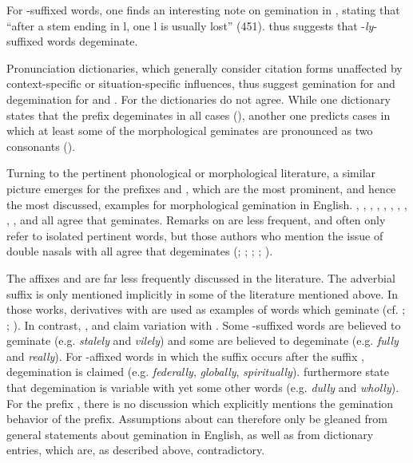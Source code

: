   For -suffixed words, one finds an interesting note on gemination in \cite{Wells.2008}, stating that ``after a stem ending in l, one l is usually lost'' (451). \cite{Wells.2008} thus suggests that \hbox{-}\textit{ly}-suffixed words degeminate.
 
 Pronunciation dictionaries, which generally consider citation forms unaffected by context-specific or situation-specific influences, thus suggest gemination for  and degemination for  and . For  the dictionaries do not agree. While one dictionary states that the prefix degeminates in all cases (\citealt{Wells.2008}), another one predicts cases in which at least some of the morphological geminates are pronounced as two consonants (\citealt{Roach.2011}).
 
 
Turning to the pertinent phonological or morphological literature, a similar picture emerges for the prefixes  and , which are the most prominent, and hence the most discussed, examples for morphological gemination in English. \citet[141]{Wijk.1966}, \citet[255]{OConnor.1973}, \citet[18]{Mohanan.1986}, \citet[119 ff]{Borowsky.1986}, \citet[111]{Catford.1988}, \citet[106]{Kreidler.1989}, \citet[251]{Ladefoged.1993}, \citet[18]{Harris.1994}, \citet[22]{Spencer.1996}, \citet[1055 f.]{CohenGoldberg.2013}, and \citet{Cruttenden.2014} all agree that  geminates. Remarks on  are less frequent, and often only refer to isolated pertinent words, but those authors who mention the issue of double nasals with  all agree that  degeminates (\citealt[251]{Ladefoged.1993}; \citealt[18]{Mohanan.1986}; \citealt[18 ff]{Harris.1994}; \citealt[248]{Cruttenden.2014}; \citealt[1055 f]{CohenGoldberg.2013}).

The affixes  and  are far less frequently discussed in the literature. 
The adverbial suffix  is only mentioned implicitly in some of the literature mentioned above. In those works, derivatives with  are used as examples of words which geminate (cf. \citealt[141]{Wijk.1966}; \citealt[23]{Harris.1994}; \citealt[22]{Spencer.1996}). In contrast, \citet[82]{Bauer.2001}, \citet[353]{Giegerich.2012} and \citet[169]{Bauer.2013} claim variation with . Some -suffixed words are believed to geminate (e.g. \textit{stalely} and \textit{vilely}) and some are believed to degeminate (e.g. \textit{fully} and \textit{really}). For -affixed words in which the suffix occurs after the suffix , degemination is claimed (e.g.  \textit{federally}, \textit{globally}, \textit{spiritually}). \citet[169]{Bauer.2013} furthermore state that degemination is variable with yet some other words (e.g. \textit{dully} and \textit{wholly}). 
For the prefix , there is no discussion which explicitly mentions the gemination behavior of the prefix. Assumptions about  can therefore only be gleaned from general statements about gemination in English, as well as from dictionary entries, which are, as described above, contradictory. 

